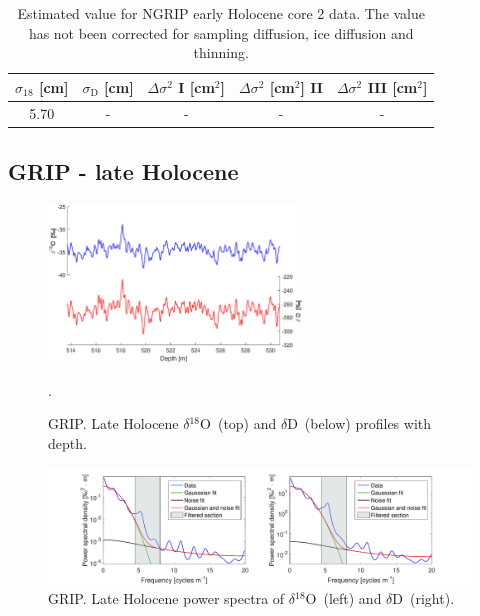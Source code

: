 \documentclass[11pt, draftcls, onecolumn]{IEEEtran} %
\numberwithin{equation}{section}
\numberwithin{table}{section}
\numberwithin{figure}{section}
\newcommand{\delOx}{$\delta{}^{18}\mathrm{O}$}
\newcommand{\delD}{$\delta\mathrm{D}$}
\begin{document}
\begin{appendices}
\begin{table}[H]
	\center
	\caption{Estimated value for NGRIP early Holocene core 2 data.
		The value has not been corrected for sampling diffusion, ice diffusion and thinning.}
	\label{NGRIP_early2_holo}
	\begin{tabular}{c c c c c} 
		\toprule
		$\sigma_{18}$ [cm] & $\sigma_\mathrm{D}$ [cm] & $\Delta\sigma^2$ I [cm$^2$] & $\Delta\sigma^2$ [cm$^2$] II & $\Delta\sigma^2$ III [cm$^2$] \\
		\midrule
		5.70 &   - &    - &     - &     - \\
		\bottomrule		
	\end{tabular}
\end{table}

\clearpage
\subsection{GRIP - late Holocene}

\begin{figure}[H]
	\vspace*{2mm}
	\begin{center}
		\includegraphics[width=0.6\textwidth]{GRIP_late_holo}
		\caption{GRIP. Late Holocene \delOx~(top) and \delD~(below) profiles with depth.}  \label{fig:GRIP_late_holo}.
	\end{center}
\end{figure}


\begin{figure}[H]
	\vspace*{2mm}
	\begin{center}
		\includegraphics[width=1\textwidth]{Figure_19}
		\caption{GRIP. Late Holocene power spectra of \delOx~(left) and \delD~(right).}  \label{fig:GRIP_late_fig_1}
	\end{center}
\end{figure}


\end{appendices}
\end{document}

